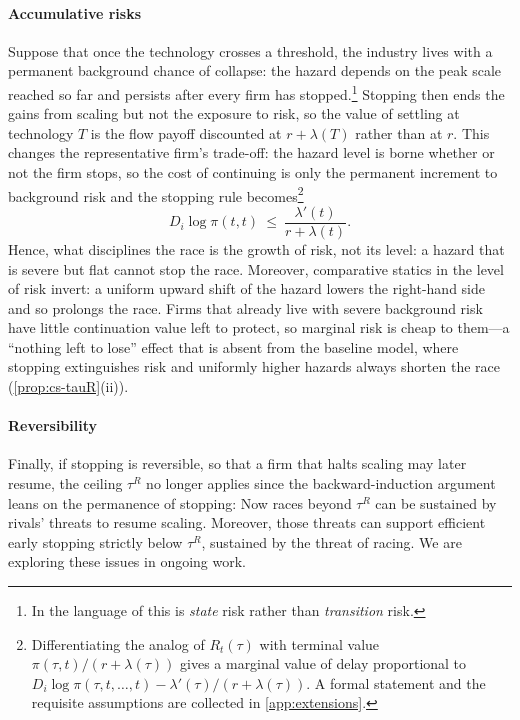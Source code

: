 \documentclass[12pt,reqno]{article}
\theoremstyle{definition} \newtheorem{example}{Example}
\theoremstyle{definition} \newtheorem{condition}{Condition}
\theoremstyle{definition} \newtheorem{corollary}{Corollary}
\theoremstyle{definition} \newtheorem{claim}{Claim}
\theoremstyle{definition} \newtheorem{definition}{Definition}
\theoremstyle{definition} \newtheorem{conjecture}{Conjecture}
\theoremstyle{definition} \newtheorem{Lemma}{Lemma}
\theoremstyle{definition} \newtheorem{lemma}{Lemma}
\theoremstyle{plain} \newtheorem{theorem}{Theorem}
\theoremstyle{definition} \newtheorem{assumption}{Assumption}
\theoremstyle{definition} \newtheorem*{assumptionnonumber}{Assumption}
\theoremstyle{definition} \newtheorem*{theoremNoNumber}{Proposition}
\theoremstyle{definition}
\theoremstyle{definition}\newtheorem{proposition}{Proposition}
\theoremstyle{definition} \newtheorem{result}{Result}
\theoremstyle{definition} \newtheorem*{definitionNoNumber}{Definition}
\theoremstyle{definition} \newtheorem{Definition}{Definition}
\theoremstyle{definition} \newtheorem*{DefinitionNoNumber}{Definition}
\theoremstyle{definition} \newtheorem*{fact}{Fact}
\theoremstyle{definition} \newtheorem*{property}{Property}
\theoremstyle{definition} \newtheorem{remark}{Remark}
\begin{document}
\paragraph{Accumulative risks} Suppose that once the technology crosses a threshold, the industry  lives with a permanent background chance of collapse: the hazard depends on the peak scale reached so far and persists after every firm has stopped.\footnote{In the language of \citet{trammell2024existential} this is \emph{state} risk rather than \emph{transition} risk.} Stopping then ends the gains from scaling but not the exposure to risk, so the value of settling at technology $T$ is the flow payoff discounted at $r+\lambda(T)$ rather than at $r$. This changes the representative firm's trade-off: the hazard level is borne whether or not the firm stops, so the cost of continuing is only the permanent increment to background risk and the stopping rule becomes\footnote{Differentiating the analog of $R_t(\tau)$ with terminal value $\pi(\tau,t)/(r+\lambda(\tau))$ gives a marginal value of delay proportional to $D_i\log\pi(\tau,t,\ldots,t)-\lambda'(\tau)/(r+\lambda(\tau))$. A formal statement and the requisite assumptions are collected in \cref{app:extensions}.}
\[
D_i\log\pi(t,t)\ \le\ \frac{\lambda'(t)}{r+\lambda(t)}.
\]
Hence, what disciplines the race is the growth of risk, not its level: a hazard that is severe but flat cannot stop the race. Moreover, comparative statics in the level of risk invert: a uniform upward shift of the hazard lowers the right-hand side and so prolongs the race. Firms that already live with severe background risk have little continuation value left to protect, so marginal risk is cheap to them---a ``nothing left to lose'' effect that is absent from the baseline model, where stopping extinguishes risk and uniformly higher hazards always shorten the race (\cref{prop:cs-tauR}(ii)).


\paragraph{Reversibility} Finally, if stopping is reversible, so that a firm that halts scaling may later resume, the ceiling $\tau^R$ no longer applies since the backward-induction argument leans on the permanence of stopping: Now races beyond $\tau^R$ can be sustained by rivals' threats to resume scaling. Moreover, those  threats can support efficient early stopping strictly below $\tau^R$, sustained by the threat of racing. We are exploring these issues in ongoing work. 
\end{document}
